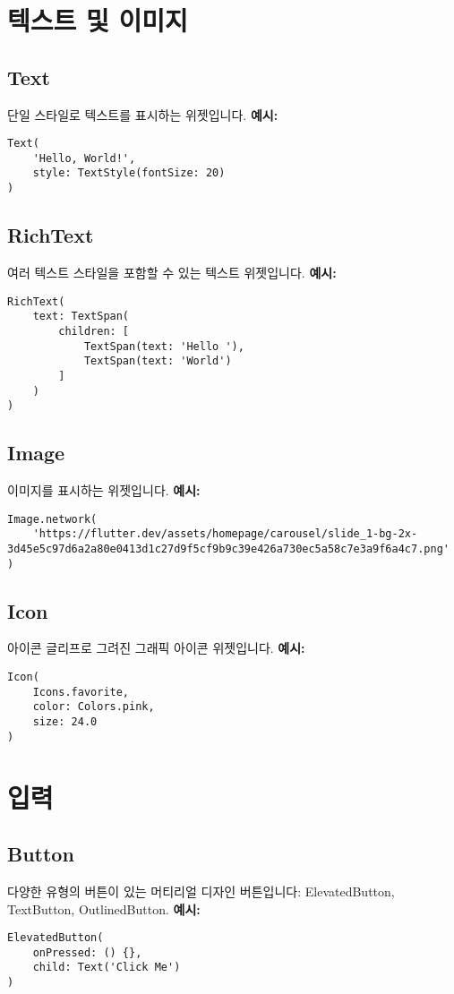 \documentclass{article}
\begin{document}
\section*{텍스트 및 이미지}
\subsection*{Text}
단일 스타일로 텍스트를 표시하는 위젯입니다.
\textbf{예시:}
\begin{lstlisting}
Text(
    'Hello, World!',
    style: TextStyle(fontSize: 20)
)
\end{lstlisting}

\subsection*{RichText}
여러 텍스트 스타일을 포함할 수 있는 텍스트 위젯입니다.
\textbf{예시:}
\begin{lstlisting}
RichText(
    text: TextSpan(
        children: [
            TextSpan(text: 'Hello '),
            TextSpan(text: 'World')
        ]
    )
)
\end{lstlisting}

\subsection*{Image}
이미지를 표시하는 위젯입니다.
\textbf{예시:}
\begin{lstlisting}
Image.network(
    'https://flutter.dev/assets/homepage/carousel/slide_1-bg-2x-3d45e5c97d6a2a80e0413d1c27d9f5cf9b9c39e426a730ec5a58c7e3a9f6a4c7.png'
)
\end{lstlisting}

\subsection*{Icon}
아이콘 글리프로 그려진 그래픽 아이콘 위젯입니다.
\textbf{예시:}
\begin{lstlisting}
Icon(
    Icons.favorite,
    color: Colors.pink,
    size: 24.0
)
\end{lstlisting}

\section*{입력}
\subsection*{Button}
다양한 유형의 버튼이 있는 머티리얼 디자인 버튼입니다: ElevatedButton, TextButton, OutlinedButton.
\textbf{예시:}
\begin{lstlisting}
ElevatedButton(
    onPressed: () {},
    child: Text('Click Me')
)
\end{lstlisting}
\end{document}
